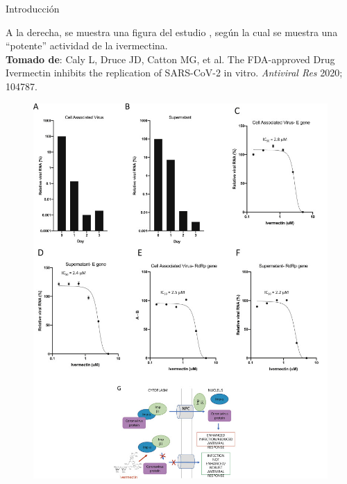 \documentclass[12pt]{beamer}
\begin{document}
	\begin{frame}{Introducción}
		\begin{multicols}{2}
			
			\scriptsize 
			A la derecha, se muestra una figura del estudio \cite{Caly2020}, según la cual se muestra una ``potente'' actividad de la ivermectina. \\
			\vspace{4em}\scriptsize 
			\textbf{Tomado de}: Caly L, Druce JD, Catton MG, et al. The FDA-approved Drug Ivermectin inhibits the replication of SARS-CoV-2 in vitro. \textit{Antiviral Res} 2020; 104787. 
			\columnbreak
			
			\begin{figure}
				\centering
				\includegraphics[width=1\columnwidth]{figs/Caly_Extracted_Image}
				\label{fig:calyextractedimage}
			\end{figure}	
		\end{multicols}
	\end{frame}
\end{document}
